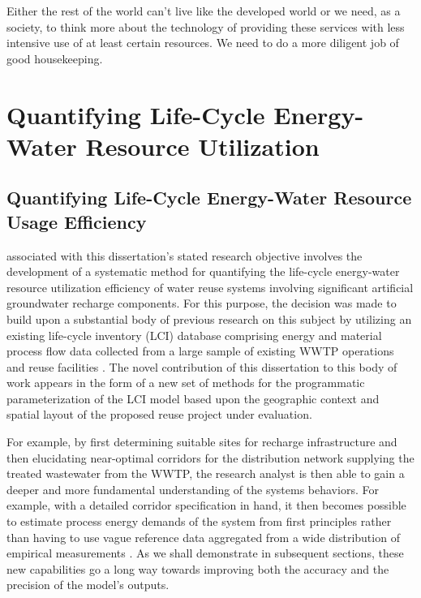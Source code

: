\begin{savequote}[75mm]
Either the rest of the world can't live like the developed world or we need, as a society, to think more about the technology of providing these services with less intensive use of at least certain  resources. We need to do a more diligent job of good housekeeping.
\end{savequote}

\chapter{Quantifying Life-Cycle Energy-Water Resource Utilization}
\label{Chapter 3}

\newpage

\section{Quantifying Life-Cycle Energy-Water Resource Usage Efficiency}

 associated with this dissertation's stated research objective involves the development of a systematic method for quantifying the life-cycle energy-water resource utilization efficiency of water reuse systems involving significant artificial groundwater recharge components. For this purpose, the decision was made to build upon a substantial body of previous research on this subject by utilizing an existing life-cycle inventory (LCI) database comprising energy and material process flow data collected from a large sample of existing WWTP operations and reuse facilities \cite{Stokes2006, Stokes2011, Stokes2014}. The novel contribution of this dissertation to this body of work appears in the form of a new set of methods for the programmatic parameterization of the LCI model based upon the geographic context and spatial layout of the proposed reuse project under evaluation. 

For example, by first determining suitable sites for recharge infrastructure and then elucidating near-optimal corridors for the distribution network supplying the treated wastewater from the WWTP, the research analyst is then able to gain a deeper and more fundamental understanding of the systems behaviors. For example, with a detailed corridor specification in hand, it then becomes possible to estimate process energy demands of the system from first principles rather than having to use vague reference data aggregated from a wide distribution of empirical measurements \cite{Klein2005}. As we shall demonstrate in subsequent sections, these new capabilities go a long way towards improving both the accuracy and the precision of the model's outputs.

